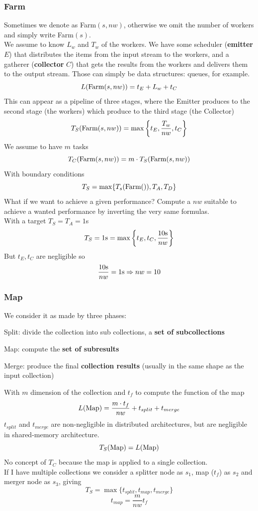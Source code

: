 \documentclass[10pt]{report}
\begin{document}
\subsubsection{Farm}
Sometimes we denote as Farm$(s, nw)$, otherwise we omit the number of workers and simply write Farm$(s)$.\\
We assume to know $L_w$ and $T_w$ of the workers. We have some scheduler (\textbf{emitter} $E$) that distributes the items from the input stream to the workers, and a gatherer (\textbf{collector} $C$) that gets the results from the workers and delivers them to the output stream. Those can simply be data structures: queues, for example.
$$L(\hbox{Farm}(s,nw)) = t_E + L_w + t_C$$
This can appear as a pipeline of three stages, where the Emitter produces to the second stage (the workers) which produce to the third stage (the Collector)
$$T_S(\hbox{Farm}(s,nw)) = \max\left\{t_E, \frac{T_w}{nw}, t_C\right\}$$
We assume to have $m$ tasks
$$T_C(\hbox{Farm}(s,nw)) = m\cdot T_S(\hbox{Farm}(s,nw))$$
With boundary conditions
$$T_S=\max\{T_s(\hbox{Farm}()),T_A,T_D\}$$
What if we want to achieve a given performance? Compute a $nw$ suitable to achieve a wanted performance by inverting the very same formulas.\\
With a target $T_S = T_A = 1$s
$$T_S = 1\hbox{s} = \max\left\{t_E, t_C, \frac{10\hbox{s}}{nw}\right\}$$
But $t_E,t_C$ are negligible so $$\frac{10\hbox{s}}{nw} = 1\hbox{s} \Rightarrow nw = 10$$
\subsubsection{Map} We consider it as made by three phases:
\begin{list}{}{}
	\item Split: divide the collection into sub collections, a \textbf{set of subcollections}
	\item Map: compute the \textbf{set of subresults}
	\item Merge: produce the final \textbf{collection results} (usually in the same shape as the input collection)
\end{list}
With $m$ dimension of the collection and $t_f$ to compute the function of the map $$L(\hbox{Map}) = \frac{m\cdot t_f}{nw} + t_{split} + t_{merge}$$
$t_{split}$ and $t_{merge}$ are non-negligible in distributed architectures, but are negligible in shared-memory architecture.
$$T_S(\hbox{Map}) = L(\hbox{Map})$$
No concept of $T_C$ because the map is applied to a single collection.\\
If I have multiple collections we consider a splitter node as $s_1$, map ($t_f$) as $s_2$ and merger node as $s_3$, giving
$$T_S=\max\{t_{split}, t_{map}, t_{merge}\}$$
$$t_{map} = \frac{m}{nw}t_f$$
\pagebreak
\end{document}
